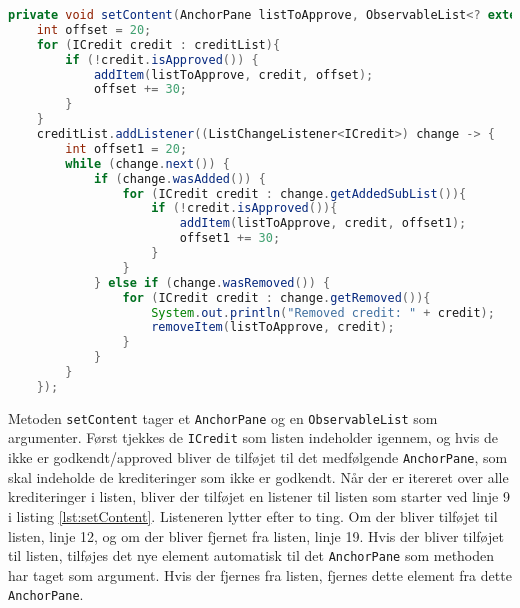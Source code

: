 \begin{lstlisting}[language=Java, label=lst:setContent, caption = Funktionen
setContet sætter listen og hvordan denne opdateres]
private void setContent(AnchorPane listToApprove, ObservableList<? extends ICredit> creditList){
    int offset = 20;
    for (ICredit credit : creditList){
        if (!credit.isApproved()) {
            addItem(listToApprove, credit, offset);
            offset += 30;
        }
    }
    creditList.addListener((ListChangeListener<ICredit>) change -> {
        int offset1 = 20;
        while (change.next()) {
            if (change.wasAdded()) {
                for (ICredit credit : change.getAddedSubList()){
                    if (!credit.isApproved()){
                        addItem(listToApprove, credit, offset1);
                        offset1 += 30;
                    }
                }
            } else if (change.wasRemoved()) {
                for (ICredit credit : change.getRemoved()){
                    System.out.println("Removed credit: " + credit);
                    removeItem(listToApprove, credit);
                }
            }
        }
    });
\end{lstlisting}

Metoden \texttt{setContent} tager et \texttt{AnchorPane} og en
\texttt{ObservableList} som argumenter. Først tjekkes de \texttt{ICredit} som
listen indeholder igennem, og hvis de ikke er godkendt/approved bliver de
tilføjet til det medfølgende \texttt{AnchorPane}, som skal indeholde de krediteringer som
ikke er godkendt. Når der er itereret over alle krediteringer i listen, bliver
der tilføjet en listener til listen som starter ved linje 9 i listing
\ref{lst:setContent}. Listeneren lytter efter to ting. Om der bliver tilføjet
til listen, linje 12, og om der bliver fjernet fra listen, linje 19. Hvis der
bliver tilføjet til listen, tilføjes det nye element automatisk til det
\texttt{AnchorPane} som methoden har taget som argument. Hvis der fjernes fra listen,
fjernes dette element fra dette \texttt{AnchorPane}.
